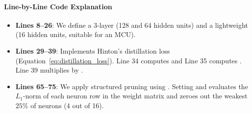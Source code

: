 \paragraph{Line-by-Line Code Explanation}
\begin{itemize}
    \item \textbf{Lines 8--26}: We define a 3-layer  (128 and 64 hidden units) and a lightweight  (16 hidden units, suitable for an MCU).
    \item \textbf{Lines 29--39}: Implements Hinton's distillation loss (Equation~\eqref{eq:distillation_loss}). Line 34 computes  and Line 35 computes . Line 39 multiplies  by .
    \item \textbf{Lines 65--75}: We apply structured pruning using . Setting  and  evaluates the $L_1$-norm of each neuron row in the weight matrix and zeroes out the weakest $25\%$ of neurons (4 out of 16).
\end{itemize}

